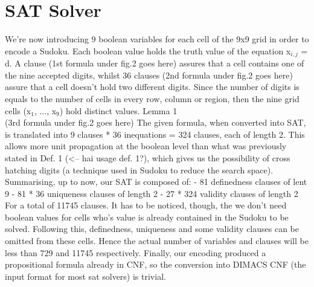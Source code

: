 \documentclass[paper=a4, fontsize=14pt]{scrartcl} %
\begin{document}
	\section*{SAT Solver}
	We're now introducing 9 boolean variables for each cell of the 9x9 grid in order to encode a Sudoku.
	\newline
	Each boolean value holds the truth value of the equation x$_{i,j}$ = d. A clause (1st formula under fig.2 goes here) assures that a cell contains one of the nine accepted digits, whilst 36 clauses (2nd formula under fig.2 goes here) assure that a cell doesn't hold two different digits.
	\newline
	Since the number of digits is equals to the number of cells in every row, column or region, then the nine grid cells (x$_1$, ..., x$_9$) hold distinct values.
	\newline
	Lemma 1 \\
	(3rd formula under fig.2 goes here)
	\newline
The given formula, when converted into SAT, is translated into 9 clauses * 36 inequations = 324 clauses, each of length 2. This allows more unit propagation at the boolean level than what was previously stated in Def. 1 (<-- hai usage def. 1?), which gives us the possibility of cross hatching digits (a technique used in Sudoku to reduce the search space).
\newline
Summarising, up to now, our SAT is composed of:
- 81 definedness clauses of lent 9
- 81 * 36 uniqueness clauses of length 2
- 27 * 324 validity clauses of length 2
For a total of 11745 clauses.
\newline
It has to be noticed, though, the we don't need boolean values for cells who's value is already contained in the Sudoku to be solved. Following this, definedness, uniqueness and some validity clauses can be omitted from these cells. Hence the actual number of variables and clauses will be less than 729 and 11745 respectively.
\newline
Finally, our encoding produced a propositional formula already in CNF, so the conversion into DIMACS CNF (the input format for most sat solvers) is trivial.
\end{document}

